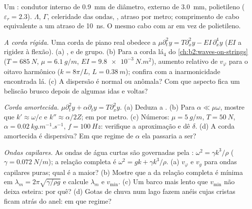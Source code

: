 \begin{exercise}[$\star$]\label{exo:b2:dispersion-wave-packets:4}
Um : condutor interno de \qty{0.9}{mm} de diâmetro, externo de
\qty{3.0}{mm}, polietileno ($\varepsilon_r = 2.3$). $\Lambda$, $\Gamma$, celeridade das ondas,
, atraso por metro; comprimento de cabo equivalente
a um atraso de \qty{10}{ns}. O mesmo cabo com ar em vez de polietileno.
\end{exercise}

\begin{exercise}[$\star\star$]\label{exo:b2:dispersion-wave-packets:5}
\emph{A corda rígida.} Uma corda de piano real obedece a $\mu\partial_t^2y = T\partial_x^2y
- EI\,\partial_x^4y$ ($EI$ a rigidez à flexão). (a) ,
 e de grupo. (b) Para a corda lá$_4$ do
\cref{ch:b2:waves-on-strings} ($T = \qty{685}{N}$, $\mu = \qty{6.1}{g/m}$, $EI =
\qty{9.8e-3}{N.m^2}$), aumento relativo de $v_\varphi$ para o oitavo
harmônico ($k = 8\pi/L$, $L = \qty{0.38}{m}$); confira com a inarmonicidade
encontrada lá. (c) A dispersão é normal ou anômala? Com que aspecto fica um
beliscão brusco depois de algumas idas e voltas?
\end{exercise}

\begin{exercise}[$\star\star$]\label{exo:b2:dispersion-wave-packets:6}
\emph{Corda amortecida.} $\mu\partial_t^2y + \alpha\partial_ty = T\partial_x^2y$. (a) Deduza
a . (b) Para $\alpha \ll \mu\omega$, mostre que $k' \approx \omega/c$ e
$k'' \approx \alpha/2Z$;  em  por metro. (c) Números: $\mu =
\qty{5}{g/m}$, $T = \qty{50}{N}$, $\alpha = \qty{0.02}{kg.m^{-1}.s^{-1}}$, $f =
\qty{100}{Hz}$: verifique a aproximação e dê $\delta$. (d) A corda amortecida é
dispersiva? Em que regime de $\alpha$ ela passaria a ser?
\end{exercise}

\begin{exercise}[$\star\star$]\label{exo:b2:dispersion-wave-packets:7}
\emph{Ondas capilares.} As ondas de água curtas são governadas pela : $\omega^2 =
\gamma k^3/\rho$ ($\gamma = \qty{0.072}{N/m}$); a relação completa é $\omega^2 = gk +
\gamma k^3/\rho$. (a) $v_\varphi$ e $v_g$ para ondas capilares puras; qual é a
maior? (b) Mostre que a  da relação completa é
mínima em $\lambda_m = 2\pi\sqrt{\gamma/\rho g}$ e calcule $\lambda_m$ e $v_{\min}$.
(c) Um barco mais lento que $v_{\min}$ não deixa esteira: por quê? (d) Gotas de chuva num
lago fazem anéis cujas cristas ficam atrás do anel: em que regime?
\end{exercise}

